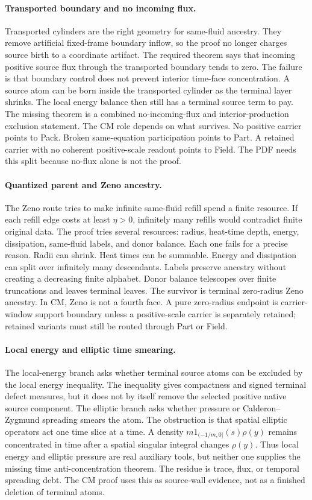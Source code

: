 \paragraph{Transported boundary and no incoming flux.}
Transported cylinders are the right geometry for same-fluid ancestry.
They remove artificial fixed-frame boundary inflow, so the proof no longer
charges source birth to a coordinate artifact.
The required theorem says that incoming positive source flux through the
transported boundary tends to zero.
The failure is that boundary control does not prevent interior time-face
concentration.
A source atom can be born inside the transported cylinder as the terminal layer
shrinks.
The local energy balance then still has a terminal source term to pay.
The missing theorem is a combined no-incoming-flux and interior-production
exclusion statement.
The CM role depends on what survives.
No positive carrier points to Pack.
Broken same-equation participation points to Part.
A retained carrier with no coherent positive-scale readout points to Field.
The PDF needs this split because no-flux alone is not the proof.

\paragraph{Quantized parent and Zeno ancestry.}
The Zeno route tries to make infinite same-fluid refill spend a finite resource.
If each refill edge costs at least \(\eta>0\), infinitely many refills would
contradict finite original data.
The proof tries several resources: radius, heat-time depth, energy,
dissipation, same-fluid labels, and donor balance.
Each one fails for a precise reason.
Radii can shrink.
Heat times can be summable.
Energy and dissipation can split over infinitely many descendants.
Labels preserve ancestry without creating a decreasing finite alphabet.
Donor balance telescopes over finite truncations and leaves terminal leaves.
The survivor is terminal zero-radius Zeno ancestry.
In CM, Zeno is not a fourth face.
A pure zero-radius endpoint is carrier-window support boundary unless a positive-scale
carrier is separately retained; retained variants must still be routed through
Part or Field.

\paragraph{Local energy and elliptic time smearing.}
The local-energy branch asks whether terminal source atoms can be excluded by
the local energy inequality.
The inequality gives compactness and signed terminal defect measures, but it
does not by itself remove the selected positive native source component.
The elliptic branch asks whether pressure or Calderon--Zygmund spreading smears
the atom.
The obstruction is that spatial elliptic operators act one time slice at a
time.
A density \(m1_{(-1/m,0]}(s)\rho(y)\) remains concentrated in time after a
spatial singular integral changes \(\rho(y)\).
Thus local energy and elliptic pressure are real auxiliary tools, but neither
one supplies the missing time anti-concentration theorem.
The residue is trace, flux, or temporal spreading debt.
The CM proof uses this as source-wall evidence, not as a finished deletion of
terminal atoms.

